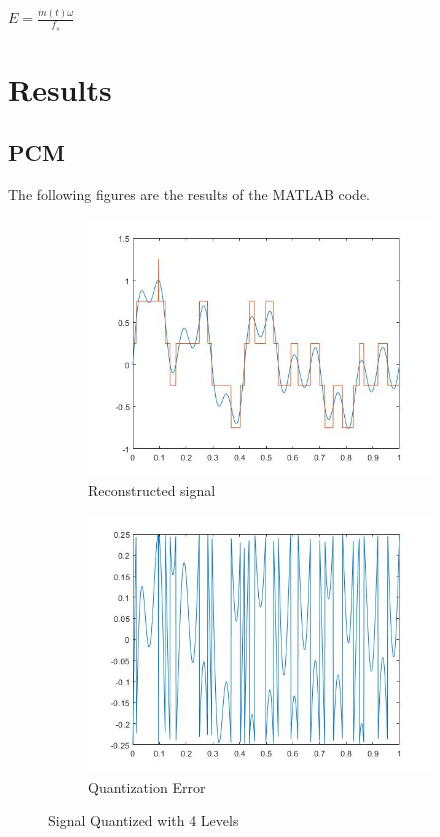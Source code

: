 \documentclass{article}
\begin{document}
\begin{center}
\Large
$
E = \frac{\dot{m}(t)\omega}{f_s}
$
\normalsize
\end{center}
\section{Results}
\subsection{PCM}
The following figures are the results of the MATLAB code.
\begin{figure}[H]
  \begin{center}
    \begin{subfigure}[b]{0.4\linewidth}
      \includegraphics[width = \linewidth]{PCM_4.jpg}
      \caption{Reconstructed signal}
    \end{subfigure}
    \begin{subfigure}[b]{0.4\linewidth}
      \includegraphics[width = \linewidth]{PCM_4_Error.jpg}
      \caption{Quantization Error}
    \end{subfigure}
    \caption{Signal Quantized with 4 Levels}
    \label{fig:figure1}
  \end{center}
\end{figure}
\end{document}
